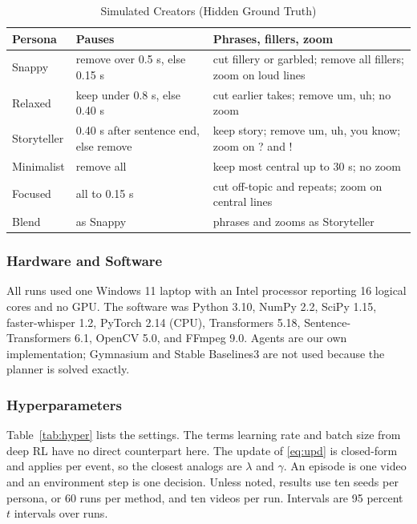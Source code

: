 \documentclass{ieeeaccess}
\begin{document}
\begin{table}[t]
\caption{Simulated Creators (Hidden Ground Truth)}
\label{tab:personas}
\setlength{\tabcolsep}{2.5pt}
\centering
\begin{tabular}{|p{14mm}|p{32mm}|p{31mm}|}
\hline
Persona & Pauses & Phrases, fillers, zoom \\
\hline
Snappy & remove over 0.5 s, else 0.15 s & cut fillery or garbled; remove all fillers; zoom on loud lines \\
Relaxed & keep under 0.8 s, else 0.40 s & cut earlier takes; remove um, uh; no zoom \\
Storyteller & 0.40 s after sentence end, else remove & keep story; remove um, uh, you know; zoom on ? and ! \\
Minimalist & remove all & keep most central up to 30 s; no zoom \\
Focused & all to 0.15 s & cut off-topic and repeats; zoom on central lines \\
Blend & as Snappy & phrases and zooms as Storyteller \\
\hline
\end{tabular}
\end{table}

\subsubsection{Hardware and Software}
All runs used one Windows 11 laptop with an Intel processor reporting 16 logical cores and no GPU. The software was Python 3.10, NumPy 2.2, SciPy 1.15, faster-whisper 1.2, PyTorch 2.14 (CPU), Transformers 5.18, Sentence-Transformers 6.1, OpenCV 5.0, and FFmpeg 9.0. Agents are our own implementation; Gymnasium and Stable Baselines3 are not used because the planner is solved exactly.

\subsubsection{Hyperparameters}
Table~\ref{tab:hyper} lists the settings. The terms learning rate and batch size from deep RL have no direct counterpart here. The update of \eqref{eq:upd} is closed-form and applies per event, so the closest analogs are $\lambda$ and $\gamma$. An episode is one video and an environment step is one decision. Unless noted, results use ten seeds per persona, or 60 runs per method, and ten videos per run. Intervals are 95 percent $t$ intervals over runs.
\end{document}
